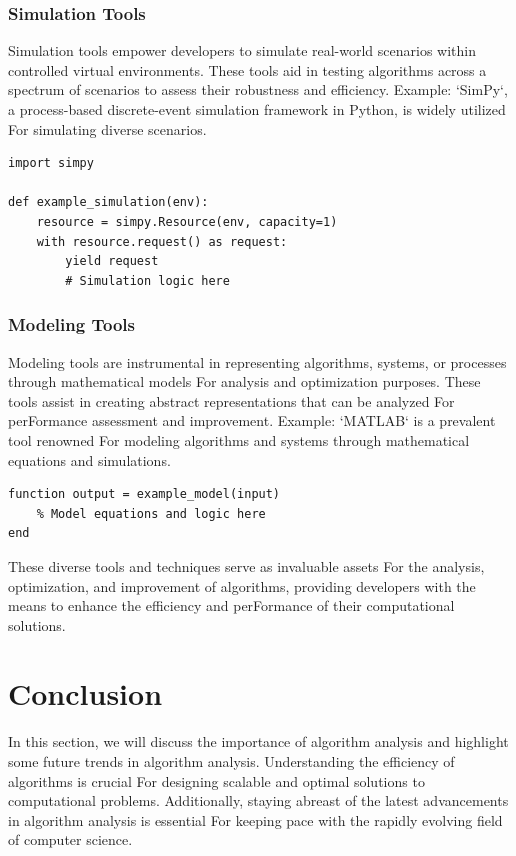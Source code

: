 \documentclass[12pt]{book} %
\begin{document}
\subsubsection{Simulation Tools}
Simulation tools empower developers to simulate real-world scenarios within controlled virtual environments. These tools aid in testing algorithms across a spectrum of scenarios to assess their robustness and efficiency.
\FloatBarrier
Example: 
\FloatBarrier
`SimPy`, a process-based discrete-event simulation framework in Python, is widely utilized For simulating diverse scenarios.
\FloatBarrier
\begin{verbatim}
import simpy

def example_simulation(env):
    resource = simpy.Resource(env, capacity=1)
    with resource.request() as request:
        yield request
        # Simulation logic here
\end{verbatim}
\FloatBarrier

\subsubsection{Modeling Tools}
Modeling tools are instrumental in representing algorithms, systems, or processes through mathematical models For analysis and optimization purposes. These tools assist in creating abstract representations that can be analyzed For perFormance assessment and improvement.
\FloatBarrier
Example:
\FloatBarrier
`MATLAB` is a prevalent tool renowned For modeling algorithms and systems through mathematical equations and simulations.
\FloatBarrier
\begin{verbatim}
function output = example_model(input)
    % Model equations and logic here
end
\end{verbatim}
\FloatBarrier
These diverse tools and techniques serve as invaluable assets For the analysis, optimization, and improvement of algorithms, providing developers with the means to enhance the efficiency and perFormance of their computational solutions.

\section{Conclusion}
In this section, we will discuss the importance of algorithm analysis and highlight some future trends in algorithm analysis. Understanding the efficiency of algorithms is crucial For designing scalable and optimal solutions to computational problems. Additionally, staying abreast of the latest advancements in algorithm analysis is essential For keeping pace with the rapidly evolving field of computer science.
\end{document}
